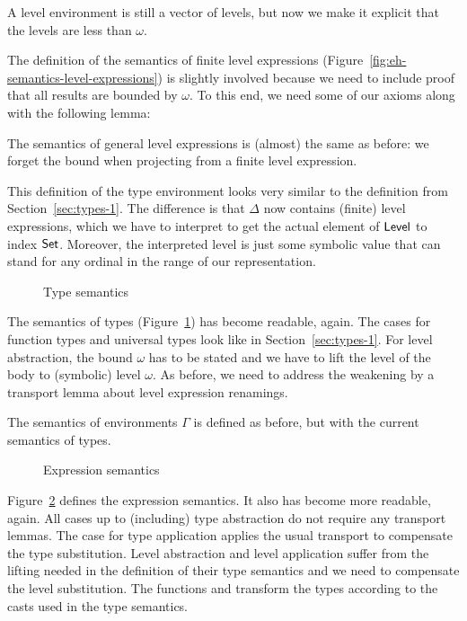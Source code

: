 \documentclass[manuscript,screen,review,anonymous]{acmart}
\begin{document}
A level environment is still a vector of levels, but now we make it
explicit that the levels are less than $\omega$.

\EHLEnvSem

The definition of the semantics of finite level expressions (Figure~\ref{fig:eh-semantics-level-expressions}) is
slightly involved because we need to include proof that all results
are bounded by $\omega$. To this end, we need some of our axioms along
with the following lemma:
\EHzeroLtomega

The semantics of general level expressions is (almost) the same as
before: we forget the bound when projecting from a finite level
expression. 

\EHFTSEAsFunction

This definition of the type environment looks very similar to the
definition from Section~\ref{sec:types-1}. The difference is that
$\Delta$ now contains (finite) level expressions, which we have to
interpret to get the actual element of $\ALevel$ to index
$\ASet$. Moreover, the interpreted level is just some symbolic value
that can stand for any ordinal in the range of our representation.

\begin{figure}[tp]
  \EHTSem
  \caption{Type semantics}
  \label{fig:eh-semantics-types}
\end{figure}
The semantics of types (Figure~\ref{fig:eh-semantics-types}) has
become readable, again. The cases for function types and universal
types look like in Section~\ref{sec:types-1}. For level abstraction,
the bound $\omega$ has to be stated and we have to lift the level of
the body to (symbolic) level $\omega$. As before, we need to address
the weakening by a transport lemma  about level
expression renamings.

The semantics of environments $\Gamma$ is defined as before, but with
the current semantics of types.
\begin{figure}
  \EHESem
  \caption{Expression semantics}
  \label{fig:eh-expression-semantics}
\end{figure}

Figure~\ref{fig:eh-expression-semantics} defines the expression
semantics. It also has become more readable, again. All cases up to
(including) type abstraction do not require any transport lemmas. The
case for type application applies the usual transport to compensate
the type substitution. Level abstraction and level application suffer
from the lifting needed in the definition of their type semantics and
we need to compensate the level substitution. The functions
 and  transform the
types according to the casts used in the type semantics.
\end{document}
